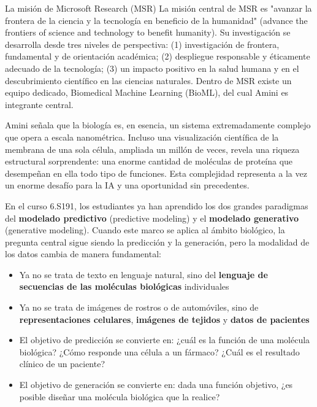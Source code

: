 \documentclass[a4paper]{article}
\begin{document}
\begin{knowledgebox}{La misión de Microsoft Research (MSR)}
La misión central de MSR es "avanzar la frontera de la ciencia y la tecnología en beneficio de la humanidad" (advance the frontiers of science and technology to benefit humanity). Su investigación se desarrolla desde tres niveles de perspectiva: (1) investigación de frontera, fundamental y de orientación académica; (2) despliegue responsable y éticamente adecuado de la tecnología; (3) un impacto positivo en la salud humana y en el descubrimiento científico en las ciencias naturales. Dentro de MSR existe un equipo dedicado, Biomedical Machine Learning (BioML), del cual Amini es integrante central.
\end{knowledgebox}

Amini señala que la biología es, en esencia, un sistema extremadamente complejo que opera a escala nanométrica. Incluso una visualización científica de la membrana de una sola célula, ampliada un millón de veces, revela una riqueza estructural sorprendente: una enorme cantidad de moléculas de proteína que desempeñan en ella todo tipo de funciones. Esta complejidad representa a la vez un enorme desafío para la IA y una oportunidad sin precedentes.

En el curso 6.S191, los estudiantes ya han aprendido los dos grandes paradigmas del \textbf{modelado predictivo} (predictive modeling) y el \textbf{modelado generativo} (generative modeling). Cuando este marco se aplica al ámbito biológico, la pregunta central sigue siendo la predicción y la generación, pero la modalidad de los datos cambia de manera fundamental:

\begin{itemize}
    \item Ya no se trata de texto en lenguaje natural, sino del \textbf{lenguaje de secuencias de las moléculas biológicas} individuales
    \item Ya no se trata de imágenes de rostros o de automóviles, sino de \textbf{representaciones celulares}, \textbf{imágenes de tejidos} y \textbf{datos de pacientes}
    \item El objetivo de predicción se convierte en: ¿cuál es la función de una molécula biológica? ¿Cómo responde una célula a un fármaco? ¿Cuál es el resultado clínico de un paciente?
    \item El objetivo de generación se convierte en: dada una función objetivo, ¿es posible diseñar una molécula biológica que la realice?
\end{itemize}
\end{document}
